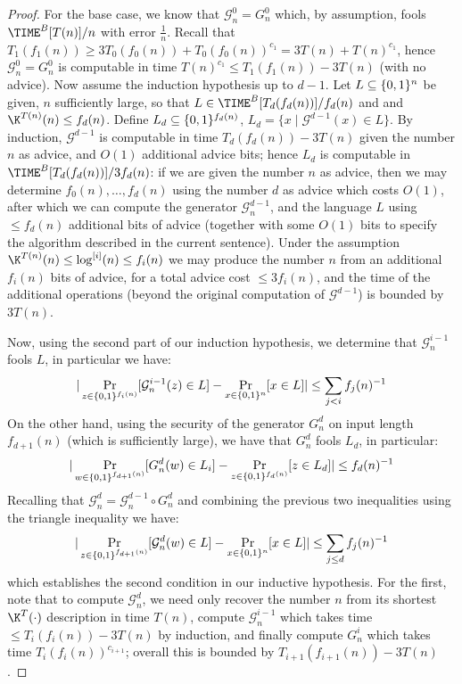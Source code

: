 \begin{proof}
For the base case, we know that $\mathcal{G}^0_n = G^0_n$ which, by assumption, fools $\TIME^B[T(n)]/n$ with error $\frac{1}{n}$. Recall that $T_1(f_1(n))  \geq  3T_0(f_0(n)) + T_0(f_0(n))^{c_1} = 3T(n) + T(n)^{c_1}$, hence $\mathcal{G}^0_n = G^0_n$ is computable in time $T(n)^{c_1}  \leq  T_1(f_1(n)) - 3T(n)$ (with no advice).
Now assume the induction hypothesis up to $d-1$. Let $L \subseteq \{0,1\}^n$ be given, $n$ sufficiently large, so that $L \in \TIME^B[T_d(f_d(n))]/f_d(n)$ and and $\K^{T(n)}(n) \leq f_d(n)$.
Define $L_d \subseteq \{0,1\}^{f_d(n)}$, $L_d = \{ x \mid \mathcal{G}^{d-1}(x) \in L\}$. By induction, $\mathcal{G}^{d-1}$ is computable in time $T_{d}(f_d(n)) - 3T(n)$ given the number $n$ as advice, and $O(1)$ additional advice bits; hence $L_d$ is computable in $\TIME^B[T_{d}(f_d(n))]/3f_d(n)$: if we are given the number $n$ as advice, then we may determine $f_0(n),\ldots,f_{d}(n)$ using the number $d$ as advice which costs $O(1)$, after which we can compute the generator $\mathcal{G}^{d-1}_n$, and the language $L$ using $\leq f_d(n)$ additional bits of advice (together with some $O(1)$ bits to specify the algorithm described in the current sentence). Under the assumption $\K^{T(n)}(n) \leq \log^{[i]}(n) \leq f_i(n)$ we may produce the number $n$ from an additional $f_i(n)$ bits of advice, for a total advice cost $\leq 3 f_i(n)$, and the time of the additional operations (beyond the original computation of $\mathcal{G}^{d-1}$) is bounded by $3T(n)$.

Now, using the second part of our induction hypothesis, we determine that $\mathcal{G}_n^{i-1}$ fools $L$, in particular we have:
\[
|\Pr_{z \in \{0,1\}^{f_i(n)}}[\mathcal{G}^{i-1}_n(z) \in L] - \Pr_{x \in \{0,1\}^{n}}[x \in L] | \leq \sum_{j < i} f_j(n)^{-1}
\]
On the other hand, using the security of the generator $G^d_n$ on input length $f_{d+1}(n)$ (which is sufficiently large), we have that $G^d_n$ fools $L_d$, in particular:
\[
|\Pr_{w \in \{0,1\}^{f_{d+1}(n)}}[G^d_n(w) \in L_i] - \Pr_{z \in \{0,1\}^{f_{d}(n)}}[z \in L_d] | \leq f_{d}(n)^{-1}
\]
Recalling that $\mathcal{G}^{d}_n = \mathcal{G}^{d-1}_n \circ G^d_n$ and combining the previous two inequalities using the triangle inequality we have:
\[
|\Pr_{z \in \{0,1\}^{f_{d+1}(n)}}[\mathcal{G}^{d}_n (w) \in L] - \Pr_{x \in \{0,1\}^{n}}[x\in L] | \leq \sum_{j \leq  d} f_j(n)^{-1}
\]
which establishes the second condition in our inductive hypothesis. For the first, note that to compute $\mathcal{G}^{d}_n$, we need only recover the number $n$ from its shortest $\K^{T}(\cdot)$ description in time $T(n)$, compute $\mathcal{G}^{i-1}_n$ which takes time $\leq T_{i}(f_i(n)) - 3T(n)$ by induction, and finally compute $G^i_n$ which takes time $T_i(f_i(n))^{c_{i+1}}$; overall this is bounded by $T_{i+1}(f_{i+1}(n)) - 3T(n)$.


\end{proof}

